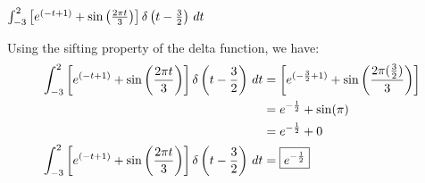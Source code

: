 \documentclass[a4paper, 10pt]{article}
\begin{document}
\begin{subproblems}[start=4]
    \item \( \int_{-3}^{2} \left[ e^{(-t+1)} + \sin \left( \frac{2\pi t}{3} \right) \right] \delta \left(t- \frac{3}{2} \right) \,dt \)
\end{subproblems}

\begin{solution}
Using the sifting property of the delta function, we have:
\begin{align*}
    \int_{-3}^{2} \left[ e^{(-t+1)} + \sin \left( \frac{2\pi t}{3} \right) \right] \delta \left(t- \frac{3}{2} \right) \,dt &= \left[ e^{(-\frac{3}{2}+1)} + \sin \left( \frac{2\pi (\frac{3}{2})}{3} \right) \right] \\
    &= e^{-\frac{1}{2}} + \sin(\pi) \\
    &= e^{-\frac{1}{2}} + 0 \\
    \int_{-3}^{2} \left[ e^{(-t+1)} + \sin \left( \frac{2\pi t}{3} \right) \right] \delta \left(t- \frac{3}{2} \right) \,dt &= \boxed{e^{-\frac{1}{2}}}
\end{align*}
\end{solution}
\end{document}
